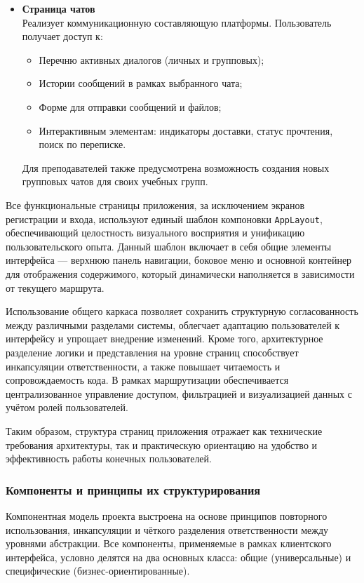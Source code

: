 \begin{itemize}
  \item \textbf{Страница чатов}\\
  Реализует коммуникационную составляющую платформы. Пользователь получает доступ к:
  \begin{itemize}
    \item Перечню активных диалогов (личных и групповых);
    \item Истории сообщений в рамках выбранного чата;
    \item Форме для отправки сообщений и файлов;
    \item Интерактивным элементам: индикаторы доставки, статус прочтения, поиск по переписке.
  \end{itemize}
  Для преподавателей также предусмотрена возможность создания новых групповых чатов для своих учебных групп.

\end{itemize}

Все функциональные страницы приложения, за исключением экранов регистрации и входа, используют единый шаблон компоновки \texttt{AppLayout}, обеспечивающий целостность визуального восприятия и унификацию пользовательского опыта. Данный шаблон включает в себя общие элементы интерфейса — верхнюю панель навигации, боковое меню и основной контейнер для отображения содержимого, который динамически наполняется в зависимости от текущего маршрута. 

Использование общего каркаса позволяет сохранить структурную согласованность между различными разделами системы, облегчает адаптацию пользователей к интерфейсу и упрощает внедрение изменений. Кроме того, архитектурное разделение логики и представления на уровне страниц способствует инкапсуляции ответственности, а также повышает читаемость и сопровождаемость кода. В рамках маршрутизации обеспечивается централизованное управление доступом, фильтрацией и визуализацией данных с учётом ролей пользователей.

Таким образом, структура страниц приложения отражает как технические требования архитектуры, так и практическую ориентацию на удобство и эффективность работы конечных пользователей.

\subsubsection{Компоненты и принципы их структурирования}

Компонентная модель проекта выстроена на основе принципов повторного использования, инкапсуляции и чёткого разделения ответственности между уровнями абстракции. Все компоненты, применяемые в рамках клиентского интерфейса, условно делятся на два основных класса: общие (универсальные) и специфические (бизнес-ориентированные).

